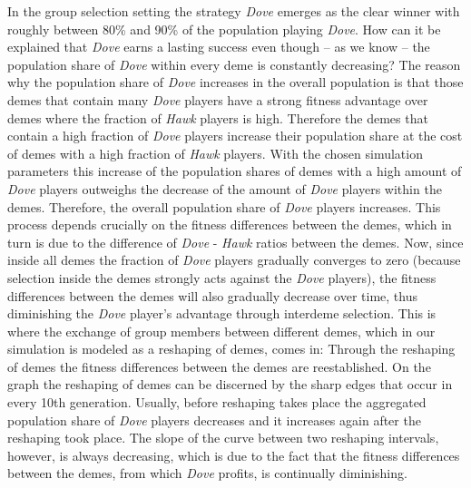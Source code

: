 In the group selection setting the strategy {\em Dove} emerges as the clear
winner with roughly between 80\% and 90\% of the population playing {\em
Dove}. How can it be explained that {\em Dove} earns a lasting success even
though -- as we know -- the population share of {\em Dove} within every deme
is constantly decreasing? The reason why the population share of {\em Dove}
increases in the overall population is that those demes that contain many
{\em Dove} players have a strong fitness advantage over demes where the
fraction of {\em Hawk} players is high. Therefore the demes that contain a
high fraction of {\em Dove} players increase their population share at the
cost of demes with a high fraction of {\em Hawk} players. With the chosen
simulation parameters this increase of the population shares of demes with a
high amount of {\em Dove} players outweighs the decrease of the amount of {\em
Dove} players within the demes. Therefore, the overall population share of
{\em Dove} players increases. This process depends crucially on the fitness
differences between the demes, which in turn is due to the difference of {\em
Dove} - {\em Hawk} ratios between the demes. Now, since inside all demes the
fraction of {\em Dove} players gradually converges to zero (because selection
inside the demes strongly acts against the {\em Dove} players), the fitness
differences between the demes will also gradually decrease over time, thus
diminishing the {\em Dove} player's advantage through interdeme selection.
This is where the exchange of group members between different demes, which in our
simulation is modeled as a reshaping of demes, comes in: Through the reshaping
of demes the fitness differences between the demes are reestablished. On the
graph the reshaping of demes can be discerned by the sharp edges that occur
in every 10th generation. Usually, before reshaping takes place the aggregated
population share of {\em Dove} players decreases and it increases again after
the reshaping took place. The slope of the curve between two reshaping
intervals, however, is always decreasing, which is due to the fact that the
fitness differences between the demes, from which {\em Dove} profits, is
continually diminishing.

